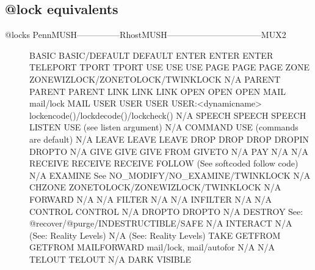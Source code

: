 \documentclass[letterpaper,10pt,english]{sphinxmanual}
\begin{document}
\subsection{@lock equivalents}
\label{\detokenize{differences:lock-equivalents}}\begin{description}
\item[{@locks PennMUSH—————RhostMUSH———————————\textendash{}MUX2}] \leavevmode
\sphinxAtStartPar
BASIC                  BASIC/DEFAULT                               DEFAULT
ENTER                  ENTER                                       ENTER
TELEPORT               TPORT                                       TPORT
USE                    USE                                         USE
PAGE                   PAGE                                        PAGE
ZONE                   ZONEWIZLOCK/ZONETOLOCK/TWINKLOCK            N/A
PARENT                 PARENT                                      PARENT
LINK                   LINK                                        LINK
OPEN                   OPEN                                        OPEN
MAIL                   mail/lock                                   MAIL
USER                   USER                                        USER
USER:\textless{}dynamicname\textgreater{}     lockencode()/lockdecode()/lockcheck()       N/A
SPEECH                 SPEECH                                      SPEECH
LISTEN                 USE (see listen argument)                   N/A
COMMAND                USE (commands are default)                  N/A
LEAVE                  LEAVE                                       LEAVE
DROP                   DROP                                        DROP
DROPIN                 DROPTO                                      N/A
GIVE                   GIVE                                        GIVE
FROM                   GIVETO                                      N/A
PAY                    N/A                                         N/A
RECEIVE                RECEIVE                                     RECEIVE
FOLLOW                 (See softcoded follow code)                 N/A
EXAMINE                See NO\_MODIFY/NO\_EXAMINE/TWINKLOCK          N/A
CHZONE                 ZONETOLOCK/ZONEWIZLOCK/TWINKLOCK            N/A
FORWARD                N/A                                         N/A
FILTER                 N/A                                         N/A
INFILTER               N/A                                         N/A
CONTROL                CONTROL                                     N/A
DROPTO                 DROPTO                                      N/A
DESTROY                See: @recover/@purge/INDESTRUCTIBLE/SAFE    N/A
INTERACT               N/A (See: Reality Levels)                   N/A (See: Reality Levels)
TAKE                   GETFROM                                     GETFROM
MAILFORWARD            mail/lock, mail/autofor                     N/A
N/A                    TELOUT                                      TELOUT
N/A                    DARK                                        VISIBLE

\end{description}
\end{document}

